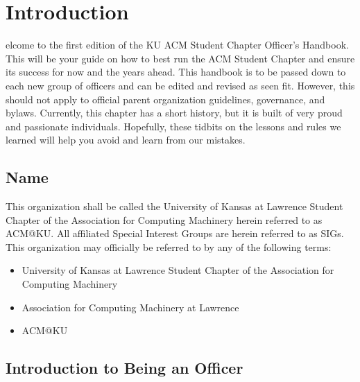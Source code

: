 %
%
\let\textcircled=\pgftextcircled
\chapter{Introduction}
\label{chap:intro}

elcome to the first edition of the KU ACM Student Chapter Officer's
Handbook. This will be your guide on how to best run the ACM Student Chapter and
ensure its success for now and the years ahead. This handbook is to be passed
down to each new group of officers and can be edited and revised as seen fit.
However, this should not apply to official parent organization guidelines,
governance, and bylaws. Currently, this chapter has a short history, but it is
built of very proud and passionate individuals. Hopefully, these tidbits on the
lessons and rules we learned will help you avoid and learn from our mistakes.

\section{Name}
\label{sec:sec01}

This organization shall be called the University of Kansas at Lawrence Student
Chapter of the Association for Computing Machinery herein referred to as ACM@KU.
All affiliated Special Interest Groups are herein referred to as SIGs.
This organization may officially be referred to by any of the following terms:
\begin{itemize}
  \item University of Kansas at Lawrence Student Chapter of the Association for
        Computing Machinery
  \item Association for Computing Machinery at Lawrence
  \item ACM@KU
\end{itemize}

\section{Introduction to Being an Officer}
\label{sec:sec02}

